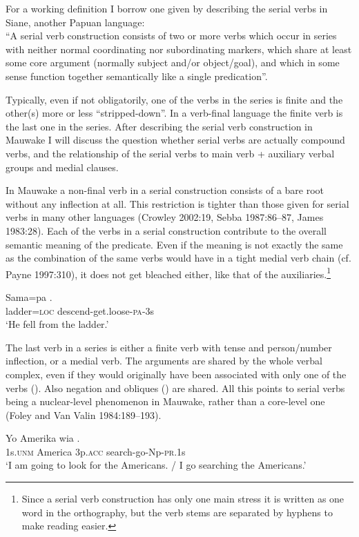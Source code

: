 For a working definition I borrow one given by \citet[28]{James1983} describing the serial verbs in Siane, another Papuan language: \\
``A serial verb construction consists of two or more verbs which occur in series with neither normal coordinating nor subordinating markers, which share at least some core argument (normally subject and/or object/goal), and which in some sense function together semantically like a single predication''. 

Typically, even if not obligatorily, one of the verbs in the series is finite and the other(s) more or less ``stripped-down''. In a verb-final language the finite verb is the last one in the series. After describing the serial verb construction in Mauwake I will discuss the question whether serial verbs are actually compound verbs, and the relationship of the serial verbs to main verb + auxiliary verbal groups and medial clauses.

In Mauwake a non-final verb in a serial construction consists of a bare root without any inflection at all. This restriction is tighter than those given for serial verbs in many other languages (Crowley 2002:19, Sebba 1987:86--87, James 1983:28). Each of the verbs in a serial construction contribute to the overall semantic meaning of the predicate. Even if the meaning is not exactly the same as the combination of the same verbs would have in a tight medial verb chain (cf. Payne 1997:310), it does not get bleached either, like that of the auxiliaries.\footnote{Since a serial verb construction has only one main stress it is written as one word in the orthography, but the verb stems are separated by hyphens to make reading easier.}

\ea%
\label{ex:x377}
\gll Sama=pa . \\
ladder=\textsc{loc} descend-get.loose-\textsc{pa}-3s\\
\glt`He fell from the ladder.'
\z

The last verb in a series is either a finite verb with tense and person/number inflection, or a medial verb. The arguments are shared by the whole verbal complex, even if they would originally have been associated with only one of the verbs (). Also negation and obliques () are shared. All this points to serial verbs being a nuclear-level phenomenon in Mauwake, rather than a core-level one (Foley and Van Valin 1984:189--193). 

\ea%
\label{ex:x378}
\gll Yo Amerika wia . \\
1s.\textsc{unm} America 3p.\textsc{acc} search-go-Np-\textsc{pr}.1s \\
\glt`I am going to look for the Americans. / I go searching the Americans.' 
\z

